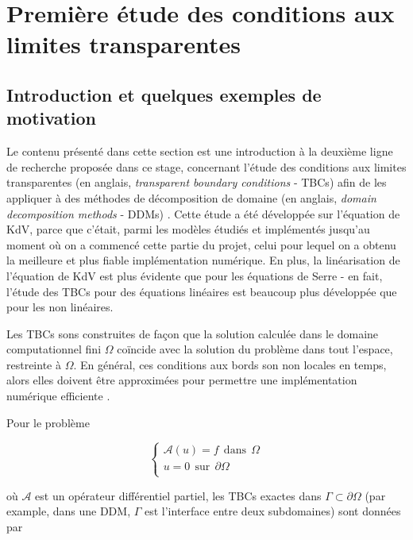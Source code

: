 \section{Première étude des conditions aux limites transparentes}
\label{sec:TBC}

\subsection{Introduction et quelques exemples de motivation}

\indent Le contenu présenté dans cette section est une introduction à la deuxième ligne de recherche proposée dans ce stage, concernant l'étude des conditions aux limites transparentes (en anglais, \emph{transparent boundary conditions} - TBCs) afin de les appliquer à des méthodes de décomposition de domaine (en anglais, \emph{domain decomposition methods} - DDMs) . Cette étude a été développée sur l'équation de KdV, parce que c'était, parmi les modèles étudiés et implémentés jusqu'au moment où on a commencé cette partie du projet, celui pour lequel on a obtenu la meilleure et plus fiable implémentation numérique. En plus, la linéarisation de l'équation de KdV est plus évidente que pour les équations de Serre - en fait, l'étude des TBCs pour des équations linéaires est beaucoup plus développée que pour les non linéaires.

\indent Les TBCs sons construites de façon que la solution calculée dans le domaine computationnel fini $\Omega$ coïncide avec la solution du problème dans tout l'espace, restreinte à $\Omega$. En général, ces conditions aux bords son non locales en temps, alors elles doivent être approximées pour permettre une implémentation numérique efficiente \cite{Xavieretal2008}.

\indent Pour le problème

\begin{equation*}
\begin{cases}
\mathcal{A}(u) = f \ \ \text{dans} \ \ \Omega\\
u = 0 \ \ \text{sur} \ \ \partial\Omega\\
\end{cases}
\end{equation*}

\noindent où $\mathcal{A}$ est un opérateur différentiel partiel, les TBCs exactes dans $\Gamma \subset \partial\Omega$ (par example, dans une DDM, $\Gamma$ est l'interface entre deux subdomaines) sont données par \cite{Japhet2003}

